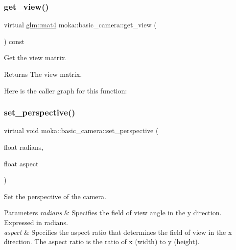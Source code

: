 \subsubsection{\texorpdfstring{get\_view()}{get\_view()}}
{\footnotesize\ttfamily virtual \mbox{\hyperlink{namespacemoka_aed2224bc0e5b79e57a8975ded94ee1aaabe14b41eb96410ea28b32bc138d885ae}{glm\+::mat4}} moka\+::basic\+\_\+camera\+::get\+\_\+view (\begin{DoxyParamCaption}{ }\end{DoxyParamCaption}) const\hspace{0.3cm}{\ttfamily [virtual]}}



Get the view matrix. 

\begin{DoxyReturn}{Returns}
The view matrix. 
\end{DoxyReturn}
Here is the caller graph for this function\+:
\mbox{\label{classmoka_1_1basic__camera_aa396c162b5705bcdc3a02006c529d932}} 
\subsubsection{\texorpdfstring{set\_perspective()}{set\_perspective()}}
{\footnotesize\ttfamily virtual void moka\+::basic\+\_\+camera\+::set\+\_\+perspective (\begin{DoxyParamCaption}\item[{float}]{radians,  }\item[{float}]{aspect }\end{DoxyParamCaption})\hspace{0.3cm}{\ttfamily [virtual]}}



Set the perspective of the camera. 


\begin{DoxyParams}{Parameters}
{\em radians} & Specifies the field of view angle in the y direction. Expressed in radians. \\
\hline
{\em aspect} & Specifies the aspect ratio that determines the field of view in the x direction. The aspect ratio is the ratio of x (width) to y (height). \\
\hline
\end{DoxyParams}
\mbox{\label{classmoka_1_1basic__camera_a48528f88bf5b5e06d4cab6f93183a62a}} 
